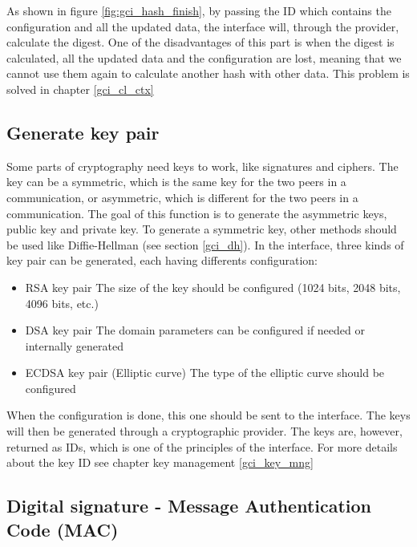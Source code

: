 As shown in figure \ref{fig:gci_hash_finish}, by passing the ID which contains
the configuration and all the updated data, the interface will, through the
provider, calculate the digest.
One of the disadvantages of this part is
when the digest is calculated, all the updated data and the configuration are lost, meaning that we cannot use them
again to calculate another hash with other data.
This problem is solved in chapter \ref{gci_cl_ctx}

\subsection{Generate key pair}
\label{gci_gen_key}

Some parts of cryptography need keys to work, like signatures and ciphers.
The key can be a symmetric, which is the same key for the two peers
in a communication, or asymmetric, which is different for the two peers in a
communication.
The goal of this function is to generate the asymmetric keys, public key and
private key. To generate a symmetric key, other methods should be used like
Diffie-Hellman (see section \ref{gci_dh}).
In the interface, three kinds of key pair can be generated, each having
differents configuration:
\begin{itemize}
  \item RSA key pair\newline
  The size of the key should be configured (1024 bits, 2048 bits, 4096 bits,
  etc.)
  \item DSA key pair\newline
  The domain parameters can be configured if needed or internally generated
  \item ECDSA key pair (Elliptic curve)\newline
  The type of the elliptic curve should be configured
\end{itemize}

When the configuration is done, this one should be sent to the
interface.
The keys will then be generated through a cryptographic provider.
The keys are, however, returned as IDs, which is one of the principles of the
interface. For more details about the key ID see chapter key management
\ref{gci_key_mng}

\subsection{Digital signature - Message Authentication Code (MAC)}
\label{gci_sign_mac}

